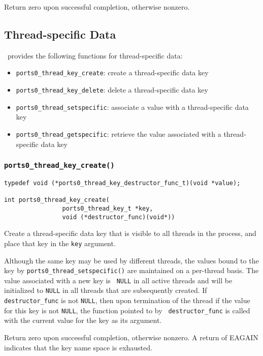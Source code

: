 Return zero upon successful completion, otherwise nonzero.


\subsection{Thread-specific Data}

\portszero\ provides the following functions for thread-specific data:

\begin{itemize}
\item {\tt ports0\_thread\_key\_create}: create a thread-specific data
key
\item {\tt ports0\_thread\_key\_delete}: delete a thread-specific data
key
\item {\tt ports0\_thread\_setspecific}: associate a value with a
thread-specific data key
\item {\tt ports0\_thread\_getspecific}: retrieve the value associated
with a thread-specific data key
\end{itemize}

\subsubsection{\tt ports0\_thread\_key\_create()}
\begin{verbatim}
typedef void (*ports0_thread_key_destructor_func_t)(void *value);

int ports0_thread_key_create(
                ports0_thread_key_t *key,
                void (*destructor_func)(void*))
\end{verbatim}

Create a thread-specific data key that is visible to all threads in
the process, and place that key in the {\tt key} argument. 

Although the same key may be used by different threads, the values
bound to the key by {\tt ports0\_thread\_setspecific()} are maintained
on a per-thread basis.  The value associated with a new key is {\tt
NULL} in all active threads and will be initialized to {\tt NULL} in
all threads that are subsequently created.  If {\tt destructor\_func}
is not {\tt NULL}, then upon termination of the thread if the value
for this key is not {\tt NULL}, the function pointed to by {\tt
destructor\_func} is called with the current value for the key as its
argument.

Return zero upon successful completion, otherwise nonzero.  A return
of EAGAIN indicates that the key name space is exhausted.

